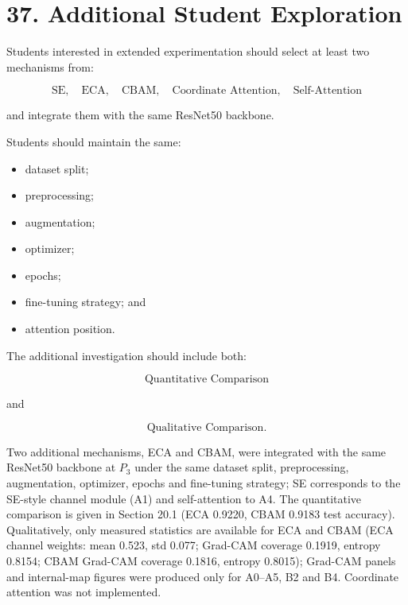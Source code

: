 \documentclass[10pt]{article}
\begin{document}
\section*{37. Additional Student Exploration}

Students interested in extended experimentation should select at least two
mechanisms from:

\[
\boxed{
\text{SE},
\quad
\text{ECA},
\quad
\text{CBAM},
\quad
\text{Coordinate Attention},
\quad
\text{Self-Attention}
}
\]

and integrate them with the same ResNet50 backbone.

Students should maintain the same:

\begin{itemize}

\item dataset split;

\item preprocessing;

\item augmentation;

\item optimizer;

\item epochs;

\item fine-tuning strategy; and

\item attention position.

\end{itemize}

The additional investigation should include both:

\[
\boxed{
\text{Quantitative Comparison}
}
\]

and

\[
\boxed{
\text{Qualitative Comparison}.
}
\]


Two additional mechanisms, ECA and CBAM, were integrated with the same ResNet50 backbone at $P_3$ under the same dataset split, preprocessing, augmentation, optimizer, epochs and fine-tuning strategy; SE corresponds to the SE-style channel module (A1) and self-attention to A4.
The quantitative comparison is given in Section 20.1 (ECA 0.9220, CBAM 0.9183 test accuracy). Qualitatively, only measured statistics are available for ECA and CBAM (ECA channel weights: mean 0.523, std 0.077; Grad-CAM coverage 0.1919, entropy 0.8154; CBAM Grad-CAM coverage 0.1816, entropy 0.8015);
Grad-CAM panels and internal-map figures were produced only for A0--A5, B2 and B4. Coordinate attention was not implemented.
\end{document}
